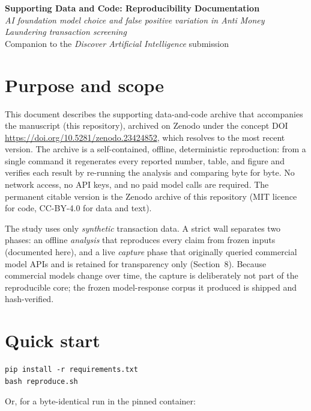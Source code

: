 \documentclass[11pt]{article}
\begin{document}
\RaggedRight

\begin{center}
{\Large\bfseries Supporting Data and Code: Reproducibility Documentation}\\[5pt]
{\itshape AI foundation model choice and false positive variation in Anti Money Laundering transaction screening}\\[3pt]
{\small Companion to the \emph{Discover Artificial Intelligence} submission}
\end{center}

\vspace{4pt}

\section{Purpose and scope}

This document describes the supporting data-and-code archive that accompanies the manuscript (this repository), archived on Zenodo under the concept DOI \url{https://doi.org/10.5281/zenodo.23424852}, which resolves to the most recent version. The archive is a self-contained, offline, deterministic reproduction: from a single command it regenerates every reported number, table, and figure and verifies each result by re-running the analysis and comparing byte for byte. No network access, no API keys, and no paid model calls are required. The permanent citable version is the Zenodo archive of this repository (MIT licence for code, CC-BY-4.0 for data and text).

The study uses only \emph{synthetic} transaction data. A strict wall separates two phases: an offline \emph{analysis} that reproduces every claim from frozen inputs (documented here), and a live \emph{capture} phase that originally queried commercial model APIs and is retained for transparency only (Section~8). Because commercial models change over time, the capture is deliberately not part of the reproducible core; the frozen model-response corpus it produced is shipped and hash-verified.

\section{Quick start}

\begin{verbatim}
pip install -r requirements.txt
bash reproduce.sh
\end{verbatim}

Or, for a byte-identical run in the pinned container:
\end{document}
